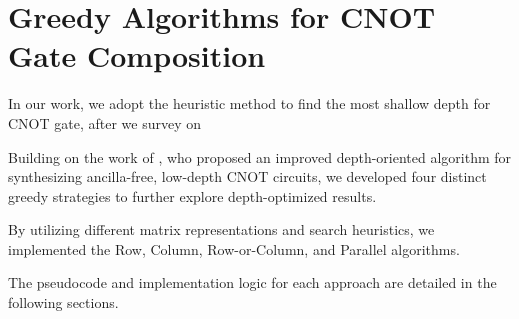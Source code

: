 \chapter{Greedy Algorithms for CNOT Gate Composition}
In our work, we adopt the heuristic method to find the most shallow depth for CNOT gate, after we survey on 

Building on the work of \cite{cryptoeprint:2024/381}, who proposed an improved depth-oriented algorithm for synthesizing ancilla-free, low-depth CNOT circuits, we developed four distinct greedy strategies to further explore depth-optimized results. 

By utilizing different matrix representations and search heuristics, we implemented the Row, Column, Row-or-Column, and Parallel algorithms. 

The pseudocode and implementation logic for each approach are detailed in the following sections.

